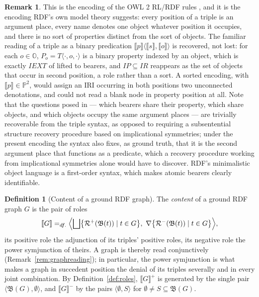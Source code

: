 \documentclass[12pt]{article}
\theoremstyle{definition}
\newtheorem{definition}{Definition}
\newtheorem{remark}{Remark}
\newcommand{\tuple}[1]{\langle #1 \rangle}
\newcommand{\Pbb}{\mathbb{P}}   %
\newcommand{\Obb}{\mathbb{O}}   %
\newcommand{\sem}[1]{\llbracket #1 \rrbracket}  %
\newcommand{\bmap}{\mathfrak{B}}  %
\newcommand{\role}{\mathcal{R}}   %
\begin{document}
\begin{remark}
\label{rem:bearermapping}
This is the encoding of the OWL 2 RL/RDF rules \citep{motik2012owl}, and it is the encoding RDF's own model theory suggests: every position of a triple is an argument place, every name denotes one object whatever position it occupies, and there is no sort of properties distinct from the sort of objects. The familiar reading of a triple as a binary predication $\sem{p}\tuple{\sem{s}, \sem{o}}$ is recovered, not lost: for each $o \in \Obb$, $P_{o} = T\tuple{\cdot, o, \cdot}$ is a binary property indexed by an object, which is exactly $IEXT$ of \citet{hayes2014rdf} lifted to bearers, and $IP \subseteq IR$ reappears as the set of objects that occur in second position, a role rather than a sort. A sorted encoding, with $\sem{p} \in \Pbb^{2}$, would assign an IRI occurring in both positions two unconnected denotations, and could not read a blank node in property position at all. Note that the questions posed in \citet{hlobil2026objects} --- which bearers share their property, which share objects, and which objects occupy the same argument places --- are trivially recoverable from the triple syntax, as opposed to requiring a subsentential structure recovery procedure based on implicational symmetries; under the present encoding the syntax also fixes, as ground truth, that it is the second argument place that functions as a predicate, which a recovery procedure working from implicational symmetries alone would have to discover. RDF's minimalistic object language is a first-order syntax, which makes atomic bearers clearly identifiable.
\end{remark}

\begin{definition}[Content of a ground RDF graph]
\label{def:graphcontents}
The \textit{content} of a ground RDF graph $G$ is the pair of roles
\[
\sem{G} =_{df.} \Bigl\langle
  \bigsqcup\bigl\{\role^{+}(\bmap(t)) \mid t \in G\bigr\},\
  \nabla\bigl\{\role^{-}(\bmap(t)) \mid t \in G\bigr\}
\Bigr\rangle,
\]
its positive role the adjunction of its triples' positive roles, its
negative role the power symjunction of theirs. A graph is thereby read
conjunctively (Remark~\ref{rem:graphreading}); in particular, the power
symjunction is what makes a graph in succedent position the denial of its triples severally and in every joint combination. By Definition~\ref{def:roles}, $\sem{G}^{+}$ is generated by the single pair $\tuple{\bmap(G), \emptyset}$, and $\sem{G}^{-}$ by the pairs $\tuple{\emptyset, S}$ for $\emptyset \neq S \subseteq \bmap(G)$.
\end{definition}
\end{document}
